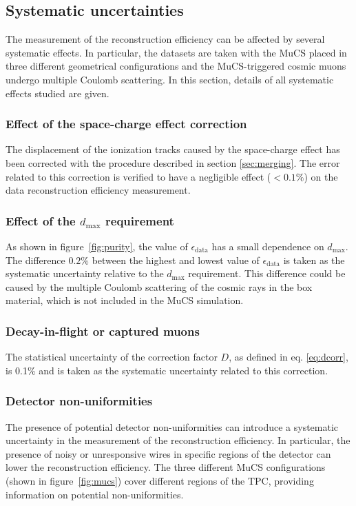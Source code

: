 \documentclass[a4paper,11pt]{article}
\begin{document}
\subsection{Systematic uncertainties}\label{sec:sys}
The measurement of the reconstruction efficiency can be affected by several systematic effects. In particular, the datasets are taken with the MuCS placed in three different geometrical configurations and the MuCS-triggered cosmic muons undergo multiple Coulomb scattering. In this section, details of all systematic effects studied are given.

\subsubsection{Effect of the space-charge effect correction}
The displacement of the ionization tracks caused by the space-charge effect has been corrected with the procedure described in section \ref{sec:merging}. The error related to this correction is verified to have a negligible effect ($<0.1\%$) on the data reconstruction efficiency measurement.

\subsubsection{Effect of the $d_{\mathrm{max}}$ requirement}

As shown in figure~\ref{fig:purity}, the value of $\epsilon_{\mathrm{data}}$ has a small dependence on $d_{\mathrm{max}}$. The difference $0.2\%$ between the highest and lowest value of $\epsilon_{\mathrm{data}}$ is taken as the systematic uncertainty relative to the $d_{\mathrm{max}}$ requirement. This difference could be caused by the multiple Coulomb scattering of the cosmic rays in the box material, which is not included in the MuCS simulation.

\subsubsection{Decay-in-flight or captured muons}\label{sec:dif}
The statistical uncertainty of the correction factor $D$, as defined in eq. \eqref{eq:dcorr}, is 0.1\% and is taken as the systematic uncertainty related to this correction.

\subsubsection{Detector non-uniformities}\label{sec:wires}
The presence of potential detector non-uniformities can introduce a systematic uncertainty in the measurement of the reconstruction efficiency. In particular, the presence of noisy or unresponsive wires in specific regions of the detector can lower the reconstruction efficiency. The three different MuCS configurations (shown in figure~\ref{fig:mucs}) cover different regions of the TPC, providing information on potential non-uniformities.
\end{document}
